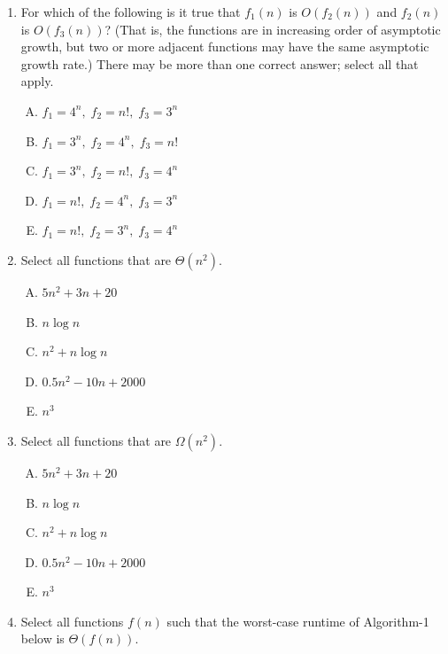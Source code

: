 \documentclass[11pt]{article}
\begin{document}
\begin{enumerate}
\item For which of the following is it true that $f_1(n)$ is $O(f_2(n))$ and
$f_2(n)$ is $O(f_3(n))$? (That is, the functions are in increasing
order of asymptotic growth, but two or more adjacent functions may have the same
asymptotic growth rate.) There may be more than one correct answer; select all
that apply.

\begin{enumerate}[A.]
  
  \item $f_1 = 4^n,\; f_2 = n!,\; f_3 = 3^n$
  
  \item $f_1 = 3^n,\; f_2 = 4^n,\; f_3 = n!$
  
  \item $f_1 = 3^n,\; f_2 = n!,\; f_3 = 4^n$
  
  \item $f_1 = n!,\; f_2 = 4^n,\; f_3 = 3^n$
  
  \item $f_1 = n!,\; f_2 = 3^n,\; f_3 = 4^n$
\end{enumerate}

\item Select all functions that are $\Theta(n^2)$.

\begin{enumerate}[A.]
    \item $5n^2 + 3n + 20$
    \item $n \log n$
    \item $n^2 + n \log n$
    \item $0.5 n^2 - 10 n + 2000$
    \item $n^3$

\end{enumerate}

\item Select all functions that are $\Omega(n^2)$.

\begin{enumerate}[A.]
    \item $5n^2 + 3n + 20$
    \item $n \log n$
    \item $n^2 + n \log n$
    \item $0.5 n^2 - 10 n + 2000$
    \item $n^3$

\end{enumerate}

\item Select all functions $f(n)$ such that the worst-case runtime of
Algorithm-1 below is $\Theta(f(n))$.


\end{enumerate}
\end{document}
